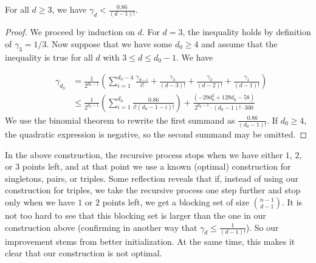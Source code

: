 \documentclass[11pt,a4paper]{article}
\begin{document}
\begin{theorem}
    For all $d\geq 3$, we have $\gamma_d<\frac{0.86}{(d-1)!}$.
\end{theorem}

\begin{proof}
    We proceed by induction on $d$. For $d=3$, the inequality holds by definition of $\gamma_3=1/3$. Now suppose that we have some $d_0\geq 4$ and assume that the inequality is true for all $d$ with $3\leq d\leq d_0-1$. We have

    \begin{eqnarray*}
        &\gamma_{d_0}&= \frac{1}{2^{d_0 -1}}\left( \sum_{i=1}^{d_0-4} \frac{\gamma_{d-i}}{i!}+ \frac{\gamma_3}{(d-3)!} + \frac{\gamma_2}{(d-2)!} +\frac{\gamma_1}{(d-1)!}\right) \\
        &&\leq\frac{1}{2^{d_0 -1}}\left( \sum_{i=1}^{d_0} \frac{0.86}{i!(d_0-1-i)!}\right)+ \frac{(-29d_0^2+129d_0-58)}{2^{d_0 -1}\cdot(d_0-1)!\cdot 300}
    \end{eqnarray*}
    We use the binomial theorem to rewrite the first summand as $\frac{0.86}{(d_0 -1)!}$. If $d_0\geq 4$, the quadratic expression is negative, so the second summand may be omitted.
\end{proof}


In the above construction, the recursive process stops when we have either $1$, $2$, or $3$ points left, and at that point we use a known (optimal) construction for singletons, pairs, or triples. Some reflection reveals that if, instead of using our construction for triples, we take the recursive process one step further and stop only when we have $1$ or $2$ points left, we get a blocking set of size $\binom{n-1}{d-1}$. It is not too hard to see that this blocking set is larger than the one in our construction above (confirming in another way that $\gamma_d\leq \frac{1}{(d-1)!}$). So our improvement stems from better initialization. At the same time, this makes it clear that our construction is not optimal.
\end{document}
